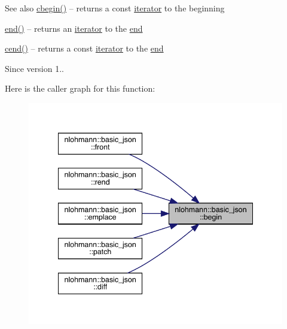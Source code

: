 \begin{DoxySeeAlso}{See also}
\mbox{\hyperlink{classnlohmann_1_1basic__json_ad865d6c291b237ae508d5cb2146b5877}{cbegin()}} -- returns a const \mbox{\hyperlink{classnlohmann_1_1basic__json_a099316232c76c034030a38faa6e34dca}{iterator}} to the beginning 

\mbox{\hyperlink{classnlohmann_1_1basic__json_a13e032a02a7fd8a93fdddc2fcbc4763c}{end()}} -- returns an \mbox{\hyperlink{classnlohmann_1_1basic__json_a099316232c76c034030a38faa6e34dca}{iterator}} to the \mbox{\hyperlink{classnlohmann_1_1basic__json_a13e032a02a7fd8a93fdddc2fcbc4763c}{end}} 

\mbox{\hyperlink{classnlohmann_1_1basic__json_a8dba7b7d2f38e6b0c614030aa43983f6}{cend()}} -- returns a const \mbox{\hyperlink{classnlohmann_1_1basic__json_a099316232c76c034030a38faa6e34dca}{iterator}} to the \mbox{\hyperlink{classnlohmann_1_1basic__json_a13e032a02a7fd8a93fdddc2fcbc4763c}{end}}
\end{DoxySeeAlso}
\begin{DoxySince}{Since}
version 1.. 
\end{DoxySince}
Here is the caller graph for this function\+:\nopagebreak
\begin{figure}[H]
\begin{center}
\leavevmode
\includegraphics[width=341pt]{classnlohmann_1_1basic__json_a0ff28dac23f2bdecee9564d07f51dcdc_icgraph}
\end{center}
\end{figure}
\mbox{\label{classnlohmann_1_1basic__json_a4f0f5dd42b2987ff20306ed78bd31d1d}} 
